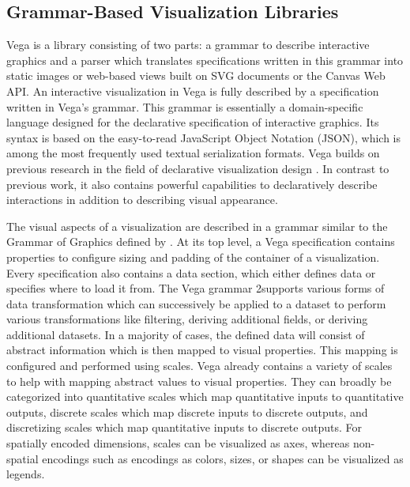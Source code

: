 \subsection{Grammar-Based Visualization Libraries}

Vega \parencite{Vega} is a library consisting of two parts: a grammar
to describe interactive graphics and a parser which translates
specifications written in this grammar into static images or web-based
views built on SVG documents or the Canvas Web API. An interactive
visualization in Vega is fully described by a specification written in
Vega's grammar. This grammar is essentially a domain-specific language
designed for the declarative specification of interactive
graphics. Its syntax is based on the easy-to-read JavaScript Object
Notation (JSON), which is among the most frequently used textual
serialization formats. Vega builds on previous research in the field
of declarative visualization design \parencite{GrammarOfGraphics}. In
contrast to previous work, it also contains powerful capabilities to
declaratively describe interactions \parencite{ReactiveVega} in
addition to describing visual appearance.

The visual aspects of a visualization are described in a grammar
similar to the Grammar of Graphics defined by
\textcite{GrammarOfGraphics}. At its top level, a Vega specification
contains properties to configure sizing and padding of the container
of a visualization. Every specification also contains a data section,
which either defines data or specifies where to load it from. The Vega
grammar 2supports various forms of data transformation which can
successively be applied to a dataset to perform various
transformations like filtering, deriving additional fields, or
deriving additional datasets. In a majority of cases, the defined data
will consist of abstract information which is then mapped to visual
properties. This mapping is configured and performed using scales.
Vega already contains a variety of scales to help with mapping
abstract values to visual properties. They can broadly be categorized
into quantitative scales which map quantitative inputs to quantitative
outputs, discrete scales which map discrete inputs to discrete
outputs, and discretizing scales which map quantitative inputs to
discrete outputs. For spatially encoded dimensions, scales can be
visualized as axes, whereas non-spatial encodings such as encodings as
colors, sizes, or shapes can be visualized as legends.

